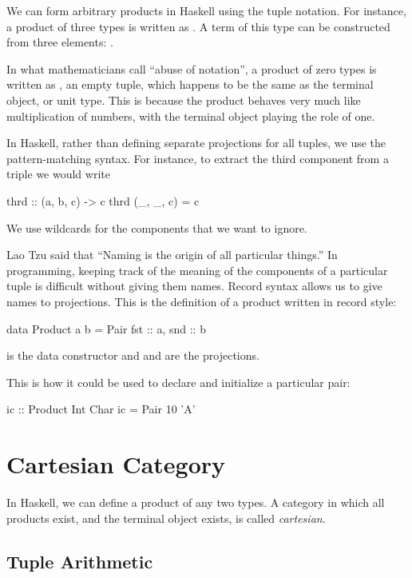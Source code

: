 \documentclass[DaoFP]{subfiles}
\begin{document}
We can form arbitrary products in Haskell using the tuple notation. For instance, a product of three types is written as . A term of this type can be constructed from three elements: . 

In what mathematicians call ``abuse of notation'', a product of zero types is written as \hask{()}, an empty tuple, which happens to be the same as the terminal object, or unit type. This is because the product behaves very much like multiplication of numbers, with the terminal object playing the role of one.

In Haskell, rather than defining separate projections for all tuples, we use the pattern-matching syntax. For instance, to extract the third component from a triple we would write

\begin{haskell}
thrd :: (a, b, c) -> c
thrd (_, _, c) = c
\end{haskell}
We use wildcards for the components that we want to ignore.

Lao Tzu said that ``Naming is the origin of all particular things.'' In programming, keeping track of the meaning of the components of a particular tuple is difficult without giving them names. Record syntax allows us to give names to projections. This is the definition of a product written in record style:
\begin{haskell}
data Product a b = Pair { fst :: a, snd :: b }
\end{haskell}
 is the data constructor and  and  are the projections. 

This is how it could be used to declare and initialize a particular pair:
\begin{haskell}
ic :: Product Int Char
ic = Pair 10 'A'
\end{haskell}

\section{Cartesian Category}

In Haskell, we can define a product of any two types. A category in which all products exist, and the terminal object exists, is called \emph{cartesian}. 

\subsection{Tuple Arithmetic}
\end{document}

